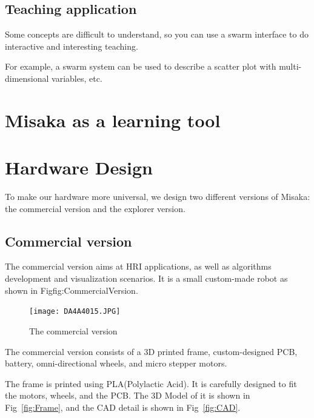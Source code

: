 \documentclass[sigconf]{acmart}
\begin{document}
\subsection{Teaching application}

Some concepts are difficult to understand, so you can use a swarm interface to do interactive and interesting teaching.

For example, a swarm system can be used to describe a scatter plot with multi-dimensional variables, etc.

\section{Misaka as a learning tool}

\section{Hardware Design}

To make our hardware more universal, we design two different versions of Misaka: the commercial version and the explorer version.

\subsection{Commercial version}

The commercial version aims at HRI applications, as well as algorithms development and visualization scenarios. It is a small custom-made robot as shown in Fig{fig:CommercialVersion}.

\begin{figure}[h]
  \centering
  \texttt{[image: DA4A4015.JPG]}
  \caption{The commercial version}
  \label{fig:CommercialVersion}
\end{figure}

The commercial version consists of a 3D printed frame, custom-designed PCB, battery, omni-directional wheels, and micro stepper motors.

The frame is printed using PLA(Polylactic Acid). It is carefully designed to fit the motors, wheels, and the PCB. The 3D Model of it is shown in Fig~\ref{fig:Frame}, and the CAD detail is shown in Fig~\ref{fig:CAD}.
\end{document}
